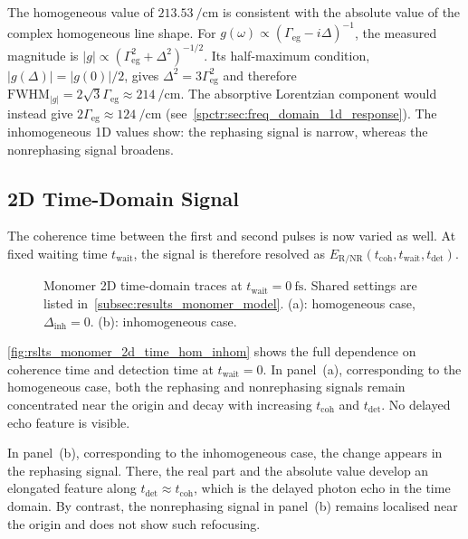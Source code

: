 The homogeneous value of \(\SI{213.53}{\per\centi\metre}\) is consistent with the absolute value of the complex homogeneous line shape. For \(g(\omega)\propto(\Gamma_{\mathrm{eg}}-i\Delta)^{-1}\), the measured magnitude is \mbox{\(|g|\propto(\Gamma_{\mathrm{eg}}^{2}+\Delta^{2})^{-1/2}\)}. Its half-maximum condition, \(|g(\Delta)|=|g(0)|/2\), gives \(\Delta^{2}=3\Gamma_{\mathrm{eg}}^{2}\) and therefore \(\mathrm{FWHM}_{|g|}=2\sqrt{3}\Gamma_{\mathrm{eg}}\approx\SI{214}{\per\centi\metre}\). The absorptive Lorentzian component would instead give \(2\Gamma_{\mathrm{eg}}\approx\SI{124}{\per\centi\metre}\) (see~\autoref{spctr:sec:freq_domain_1d_response}). The inhomogeneous 1D values show: the rephasing signal is narrow, whereas the nonrephasing signal broadens.

\subsection{2D Time-Domain Signal}
\label{subsec:results_monomer_2d_time}

The coherence time between the first and second pulses is now varied as well.
At fixed waiting time \(t_{\mathrm{wait}}\), the signal is therefore resolved as
\(E_{\mathrm{R/NR}}(t_{\mathrm{coh}},t_{\mathrm{wait}},t_{\mathrm{det}})\).

\begin{figure}[htbp]
    \centering
    \caption{Monomer 2D time-domain traces at
    \(t_{\mathrm{wait}}=\SI{0}{\femto\second}\). Shared settings are listed
    in~\autoref{subsec:results_monomer_model}. (a): homogeneous case,
    \(\Delta_{\mathrm{inh}}=0\). (b):
    inhomogeneous case.}
    \label{fig:rslts_monomer_2d_time_hom_inhom}
\end{figure}

\autoref{fig:rslts_monomer_2d_time_hom_inhom} shows the full dependence on
coherence time and detection time at \(t_{\mathrm{wait}}=0\). In panel~(a),
corresponding to the homogeneous case, both the rephasing and nonrephasing
signals remain concentrated near the origin and decay with increasing
\(t_{\mathrm{coh}}\) and \(t_{\mathrm{det}}\). No delayed echo feature is
visible.

In panel~(b), corresponding to the inhomogeneous case, the change appears in
the rephasing signal. There, the real part and the absolute value develop an
elongated feature along \(t_{\mathrm{det}}\approx t_{\mathrm{coh}}\), which is
the delayed photon echo in the time domain. By contrast, the nonrephasing
signal in panel~(b) remains localised near the origin and does not show such
refocusing.

